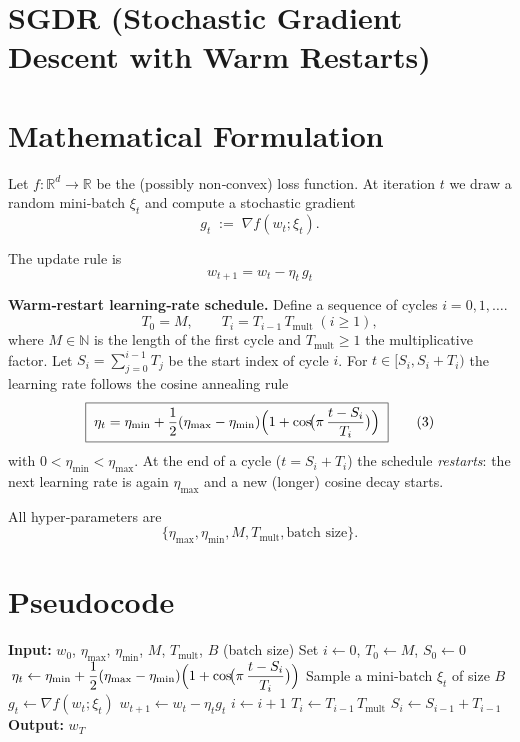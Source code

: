 \documentclass{article}
\begin{document}
\section*{SGDR (Stochastic Gradient Descent with Warm Restarts)}

\section*{Mathematical Formulation}
Let $f:\mathbb{R}^{d}\rightarrow\mathbb{R}$ be the (possibly non‑convex) loss function.  
At iteration $t$ we draw a random mini‑batch $\xi_{t}$ and compute a stochastic gradient 
\[
g_{t}\;:=\;\nabla f(w_{t};\xi_{t}) .
\]

The update rule is
\[
\boxed{\,w_{t+1}=w_{t}-\eta_{t}\,g_{t}\,}                                      \tag{1}
\]

\noindent\textbf{Warm‑restart learning‑rate schedule.}  
Define a sequence of cycles $i=0,1,\dots$.
\[
T_{0}=M,\qquad T_{i}=T_{i-1}\,T_{\text{mult}}\;(i\ge 1),                    \tag{2}
\]
where $M\in\mathbb{N}$ is the length of the first cycle and $T_{\text{mult}}\ge 1$ the 
multiplicative factor.  
Let $S_{i}=\sum_{j=0}^{i-1}T_{j}$ be the start index of cycle $i$.  
For $t\in[S_{i},S_{i}+T_{i})$ the learning rate follows the cosine annealing rule
\[
\boxed{\;
\eta_{t}= \eta_{\min}
          +\frac{1}{2}(\eta_{\max}-\eta_{\min})
            \Bigl(1+\cos\!\bigl(\pi\,\frac{t-S_{i}}{T_{i}}\bigr)\Bigr)
        \;}
        \tag{3}
\]
with $0<\eta_{\min}<\eta_{\max}$.  
At the end of a cycle ($t=S_{i}+T_{i}$) the schedule \emph{restarts}: the next
learning rate is again $\eta_{\max}$ and a new (longer) cosine decay starts.

All hyper‑parameters are
\[
\bigl\{\eta_{\max},\eta_{\min},M,T_{\text{mult}},\text{batch size}\bigr\}.
\]

\section*{Pseudocode}
\begin{algorithm}
\caption{SGDR}
\begin{algorithmic}[1]
\State \textbf{Input:} $w_{0}$, $\eta_{\max}$, $\eta_{\min}$, $M$, $T_{\text{mult}}$, $B$ (batch size)
\State Set $i\gets 0$, $T_{0}\gets M$, $S_{0}\gets 0$
    \State $\,\displaystyle\eta_{t}\gets \eta_{\min}
          +\frac{1}{2}(\eta_{\max}-\eta_{\min})
            \Bigl(1+\cos\!\bigl(\pi\,\frac{t-S_{i}}{T_{i}}\bigr)\Bigr)$ 
    \State Sample a mini‑batch $\xi_{t}$ of size $B$
    \State $g_{t}\gets \nabla f(w_{t};\xi_{t})$
    \State $w_{t+1}\gets w_{t}-\eta_{t} g_{t}$                     
        \State $i\gets i+1$                     
        \State $T_{i}\gets T_{i-1}\,T_{\text{mult}}$
        \State $S_{i}\gets S_{i-1}+T_{i-1}$
    \EndIf
\EndFor
\State \textbf{Output:} $w_{T}$
\end{algorithmic}
\end{algorithm}
\end{document}
